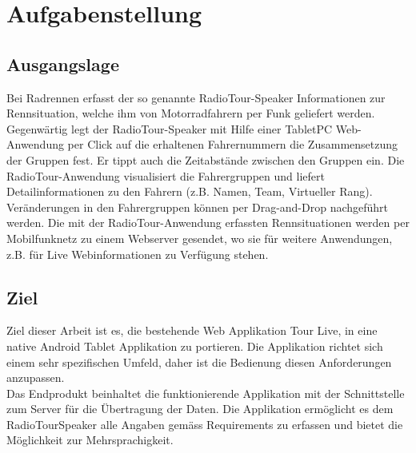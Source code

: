 \chapter*{Aufgabenstellung}

\section*{Ausgangslage}
Bei Radrennen erfasst der so genannte RadioTour-Speaker Informationen zur Rennsituation, welche ihm von Motorradfahrern per Funk geliefert werden. Gegenwärtig legt der RadioTour-Speaker mit Hilfe einer TabletPC Web-Anwendung per Click auf die erhaltenen Fahrernummern die Zusammensetzung der Gruppen fest. Er tippt auch die Zeitabstände zwischen den Gruppen ein. Die RadioTour-Anwendung  visualisiert die Fahrergruppen und liefert Detailinformationen zu den Fahrern (z.B. Namen, Team, Virtueller Rang). Veränderungen in den Fahrergruppen können per Drag-and-Drop nachgeführt werden. Die mit der RadioTour-Anwendung erfassten Rennsituationen werden per Mobilfunknetz zu einem Webserver gesendet, wo sie für weitere Anwendungen, z.B. für Live Webinformationen zu Verfügung stehen.

\section*{Ziel}
Ziel dieser Arbeit ist es, die bestehende Web Applikation Tour Live, in eine native Android Tablet Applikation zu portieren. Die Applikation richtet sich einem sehr spezifischen Umfeld, daher ist die Bedienung diesen Anforderungen anzupassen.
\\
Das Endprodukt beinhaltet die funktionierende Applikation mit der Schnittstelle zum Server für die Übertragung der Daten. Die Applikation ermöglicht es dem RadioTour\-Speaker alle Angaben gemäss Requirements zu erfassen und bietet die Möglichkeit zur Mehrsprachigkeit.

